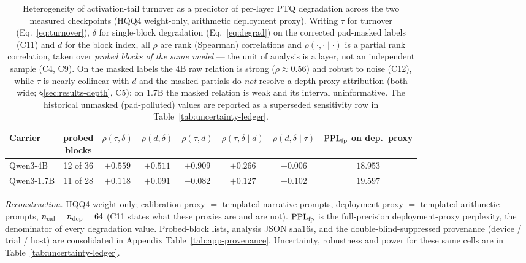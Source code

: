 \begin{table}[t]
\centering
\caption{Heterogeneity of activation-tail turnover as a predictor of per-layer PTQ degradation
across the two measured checkpoints (HQQ4 weight-only, arithmetic deployment proxy). Writing
$\tau$ for turnover (Eq.~\ref{eq:turnover}), $\delta$ for single-block degradation
(Eq.~\ref{eq:degrad}) on the corrected pad-masked labels (C11) and $d$ for the block index, all
$\rho$ are rank (Spearman) correlations and $\rho(\cdot,\cdot\mid\cdot)$ is a partial rank
correlation, taken over \emph{probed blocks of the same model} --- the unit of analysis is a
layer, not an independent sample (C4, C9). On the masked labels the 4B raw relation is strong
($\rho\approx0.56$) and robust to noise (C12), while $\tau$ is nearly collinear with $d$ and the
masked partials do \emph{not} resolve a depth-proxy attribution (both wide;
\S\ref{sec:results-depth}, C5); on 1.7B the masked relation is weak and its interval
uninformative. The historical unmasked (pad-polluted) values are reported as a superseded
sensitivity row in Table~\ref{tab:uncertainty-ledger}.}
\label{tab:carrier-heterogeneity}
\setlength{\tabcolsep}{6pt}
{\small
\begin{tabular}{lccccccc}
\toprule
Carrier & \shortstack{probed\\blocks} &
$\rho(\tau,\delta)$ & $\rho(d,\delta)$ & $\rho(\tau,d)$ &
$\rho(\tau,\delta\mid d)$ & $\rho(d,\delta\mid\tau)$ &
\shortstack{$\mathrm{PPL}_{\rm fp}$ on\\dep.\ proxy} \\
\midrule
Qwen3-4B   & 12 of 36 & $+0.559$ & $+0.511$ & $+0.909$ & $+0.266$ & $+0.006$ & $18.953$ \\
Qwen3-1.7B & 11 of 28 & $+0.118$ & $+0.091$ & $-0.082$ & $+0.127$ & $+0.102$ & $19.597$ \\
\bottomrule
\end{tabular}
}

\smallskip
\begin{minipage}{\textwidth}
\footnotesize\raggedright
\emph{Reconstruction.} HQQ4 weight-only; calibration proxy $=$ templated narrative prompts,
deployment proxy $=$ templated arithmetic prompts, $n_{\rm cal}=n_{\rm dep}=64$ (C11 states
what these proxies are and are not). $\mathrm{PPL}_{\rm fp}$ is the full-precision
deployment-proxy perplexity, the denominator of every degradation value. Probed-block lists,
analysis JSON sha16s, and the double-blind-suppressed provenance (device / trial / host) are
consolidated in Appendix Table~\ref{tab:app-provenance}. Uncertainty, robustness and power for
these same cells are in Table~\ref{tab:uncertainty-ledger}.
\end{minipage}
\end{table}
